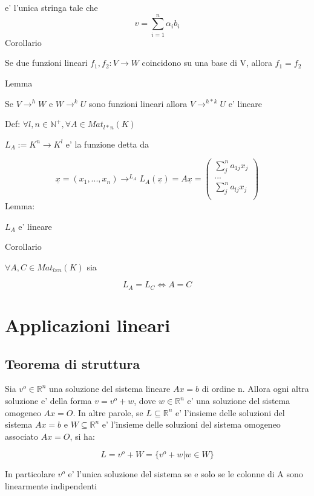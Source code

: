 \documentclass{article}
\begin{document}
e' l'unica stringa tale che
\begin{equation*}
	v= \sum^n_{i=1} \alpha_i b_i
\end{equation*}
Corollario
\begin{flushleft}
	Se due funzioni lineari $f_1,f_2: V \to W$ coincidono su una base di V, allora $f_1=f_2$
\end{flushleft}
Lemma
\begin{flushleft}
	Se $V \to^h W$ e $W \to^k U$ sono funzioni lineari allora $V \to^{h*k} U$ e' lineare
\end{flushleft}
\begin{flushleft}
	Def: $\forall l,n \in \mathbb{N}^+, \forall A \in Mat_{l*n}(K)$
\end{flushleft}
\begin{flushleft}
	$L_A := K^n \to K^l$ e' la funzione detta da
\end{flushleft}
\begin{equation*}
	\underline{x}=(x_1,...,x_n) \to^{L_A} L_A(\underline{x})= A\underline{x}=\begin{pmatrix}
		\sum^n_j a_{1j}x_j \\
		...                \\
		\sum^n_j a_{lj}x_j \\
	\end{pmatrix}
\end{equation*}
Lemma:
\begin{flushleft}
	$L_A$ e' lineare
\end{flushleft}
Corollario
\begin{flushleft}
	$\forall A,C \in Mat_{lxn}(K)$ sia
\end{flushleft}
\begin{equation*}
	L_A=L_C \iff A=C
\end{equation*}
\section{Applicazioni lineari}
\subsection{Teorema di struttura}
\begin{flushleft}
	Sia $v^o \in \mathbb{R}^n$ una soluzione del sistema lineare $Ax=b$ di ordine n. Allora ogni altra soluzione e' della forma $v=v^o+w$, dove $w \in \mathbb{R}^n$ e' una soluzione del sistema
	omogeneo $Ax=O$. In altre parole, se $L \subseteq \mathbb{R}^n$ e' l'insieme delle soluzioni del sistema $Ax=b$ e $W \subseteq \mathbb{R}^n$ e' l'insieme delle soluzioni del sistema omogeneo associato
	$Ax=O$, si ha:
\end{flushleft}
\begin{equation*}
	L=v^o+W=\{ v^o +w| w\in W\}
\end{equation*}
\begin{flushleft}
	In particolare $v^o$ e' l'unica soluzione del sistema se e solo se le colonne di A sono linearmente indipendenti
\end{flushleft}
\end{document}
